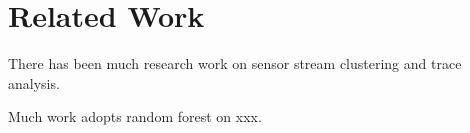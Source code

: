 \section{Related Work}
There has been much research work on sensor stream clustering and trace analysis.

Much work adopts random forest on xxx.